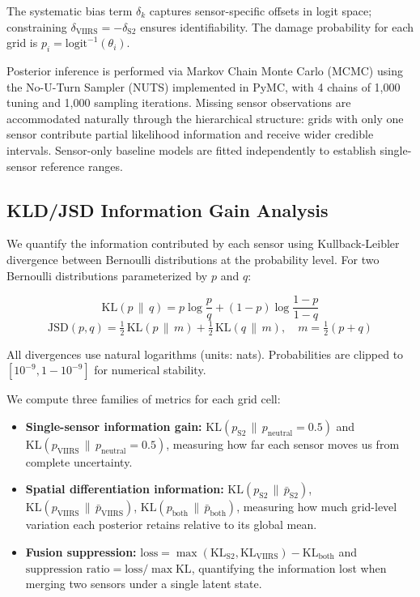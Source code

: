 \documentclass[wcp]{jmlr}
\begin{document}
The systematic bias term $\delta_k$ captures sensor-specific offsets in
logit space; constraining $\delta_{\text{VIIRS}} = -\delta_{\text{S2}}$
ensures identifiability. The damage probability for each grid is
$p_i = \text{logit}^{-1}(\theta_i)$.

Posterior inference is performed via Markov Chain Monte Carlo (MCMC) using
the No-U-Turn Sampler (NUTS) implemented in PyMC, with 4 chains of 1{,}000
tuning and 1{,}000 sampling iterations. Missing sensor observations are
accommodated naturally through the hierarchical structure: grids with only
one sensor contribute partial likelihood information and receive wider
credible intervals. Sensor-only baseline models are fitted independently
to establish single-sensor reference ranges.

\subsection{KLD/JSD Information Gain Analysis}\label{sec:kld}

We quantify the information contributed by each sensor using
Kullback-Leibler divergence between Bernoulli distributions at the
probability level. For two Bernoulli distributions parameterized by
$p$ and $q$:

\begin{equation}
\mathrm{KL}(p \,\|\, q) = p\log\frac{p}{q} + (1-p)\log\frac{1-p}{1-q}
\label{eq:kl}
\end{equation}
\begin{equation}
\mathrm{JSD}(p, q) = \tfrac{1}{2}\,\mathrm{KL}(p \,\|\, m)
  + \tfrac{1}{2}\,\mathrm{KL}(q \,\|\, m),\quad
  m = \tfrac{1}{2}(p+q)
\label{eq:jsd}
\end{equation}

All divergences use natural logarithms (units: nats). Probabilities are
clipped to $[10^{-9}, 1-10^{-9}]$ for numerical stability.

We compute three families of metrics for each grid cell:
\begin{itemize}
  \item \textbf{Single-sensor information gain:}
    $\mathrm{KL}(p_{\text{S2}} \,\|\,
       p_{\text{neutral}}=0.5)$ and
    $\mathrm{KL}(p_{\text{VIIRS}} \,\|\,
       p_{\text{neutral}}=0.5)$, measuring how far each
    sensor moves us from complete uncertainty.
  \item \textbf{Spatial differentiation information:}
    $\mathrm{KL}(p_{\text{S2}} \,\|\,
       \bar{p}_{\text{S2}})$,
    $\mathrm{KL}(p_{\text{VIIRS}} \,\|\,
       \bar{p}_{\text{VIIRS}})$,
    $\mathrm{KL}(p_{\text{both}} \,\|\,
       \bar{p}_{\text{both}})$, measuring how much
    grid-level variation each posterior retains relative to its global mean.
  \item \textbf{Fusion suppression:}
    $\text{loss} = \max(\mathrm{KL}_{\text{S2}}, \mathrm{KL}_{\text{VIIRS}})
       - \mathrm{KL}_{\text{both}}$ and
       $\text{suppression ratio} = \text{loss} / \max\text{KL}$,
    quantifying the information lost when merging two sensors under a single
    latent state.
\end{itemize}
\end{document}
